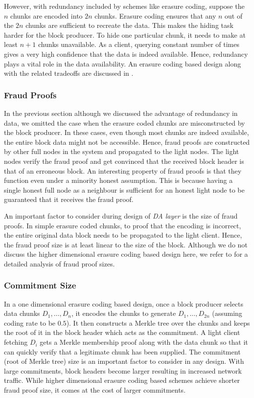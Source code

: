 \documentclass[sigconf, screen=true, nonacm]{acmart}
\newcommand{\DA}{\textit{DA layer}}
\begin{document}
            However, with redundancy included by schemes like erasure coding, suppose the $n$ chunks are encoded into $2n$ chunks. Erasure coding ensures that any $n$ out of the $2n$ chunks are sufficient to recreate the data. This makes the hiding task harder for the block producer. To hide one particular chunk, it needs to make at least $n+1$ chunks unavailable. As a client, querying constant number of times gives a very high confidence that the data is indeed available. Hence, redundancy plays a vital role in the data availability. An erasure coding based design along with the related tradeoffs are discussed in \cite{albassam2019fraud}.

        \subsubsection{Fraud Proofs}
            In the previous section although we discussed the advantage of redundancy in data, we omitted the case when the erasure coded chunks are misconstructed by the block producer. In these cases, even though most chunks are indeed available, the entire block data might not be accessible. Hence, fraud proofs are constructed by other full nodes in the system and propagated to the light nodes. The light nodes verify the fraud proof and get convinced that the received block header is that of an erroneous block. An interesting property of fraud proofs is that they function even under a minority honest assumption. This is because having a single honest full node as a neighbour is sufficient for an honest light node to be guaranteed that it receives the fraud proof. 

            An important factor to consider during design of \DA{} is the size of fraud proofs. In simple erasure coded chunks, to proof that the encoding is incorrect, the entire original data block needs to be propagated to the light client. Hence, the fraud proof size is at least linear to the size of the block. Although we do not discuss the higher dimensional erasure coding based design here, we refer to \cite{albassam2019fraud} for a detailed analysis of fraud proof sizes. 

        \subsubsection{Commitment Size}
            In a one dimensional erasure coding based design, once a block producer selects data chunks $D_1, \dots, D_n$, it encodes the chunks to generate $D_1, \dots, D_{2n}$ (assuming coding rate to be $0.5$). It then constructs a Merkle tree over the chunks and keeps the root of it in the block header which acts as the commitment. A light client fetching $D_i$ gets a Merkle membership proof along with the data chunk so that it can quickly verify that a legitimate chunk has been supplied. The commitment (root of Merkle tree) size is an important factor to consider in any design. With large commitments, block headers become larger resulting in increased network traffic. While higher dimensional erasure coding based schemes achieve shorter fraud proof size, it comes at the cost of larger commitments. 
\end{document}
